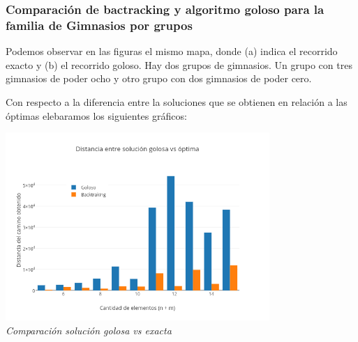 \subsubsection*{Comparación de bactracking y algoritmo goloso para la familia de Gimnasios por grupos} 

Podemos observar en las figuras el mismo mapa, donde (a) indica el recorrido exacto y (b) el recorrido goloso. Hay dos grupos de gimnasios. Un grupo con tres gimnasios de poder ocho y otro grupo con dos gimnasios de poder cero.

   \begin{figure} [h]
 \centering
       \label{fig:randomexacto}
    \label{fig:randomgoloso}
    \end{figure}
   
Con respecto a la diferencia entre la soluciones que se obtienen en relaci\'on a las \'optimas elebaramos los siguientes gráficos:\\
 
\vspace*{0.3cm} \vspace*{0.3cm}
  \begin{center}
 \includegraphics[width=0.75\textwidth]{./EJ2/familia.png}
\\{\textit{Comparación solución golosa vs exacta}}
  \end{center}

